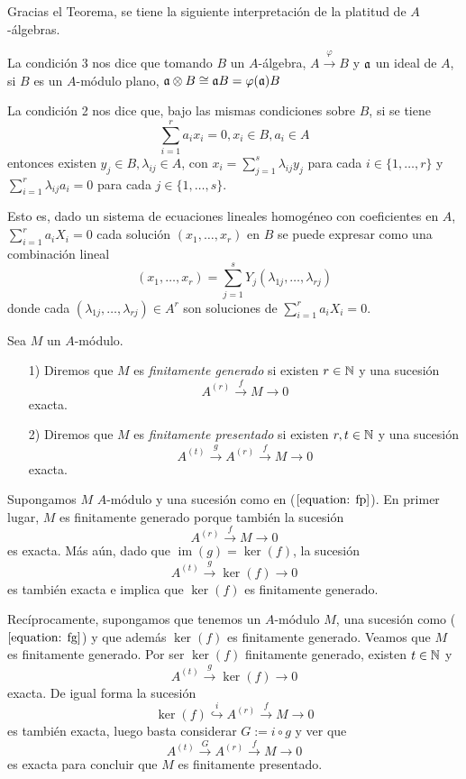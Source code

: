 \documentclass[../main.tex]{subfiles}
\begin{document}
\begin{remark} Gracias el Teorema, se tiene la siguiente interpretación de la platitud de $A$-álgebras.

	La condición 3 nos dice que tomando $B$ un $A$-álgebra, $A\overset{\varphi}{\rightarrow}B$ y $\mathfrak{a}$ un ideal de $A$, si $B$ es un $A$-módulo plano, $\mathfrak{a}\otimes B\cong \mathfrak{a} B=\varphi(\mathfrak{a})B$

	La condición 2 nos dice que, bajo las mismas condiciones sobre $B$, si se tiene $$\sum_{i=1}^r a_ix_i=0, x_i\in B, a_i\in A$$ entonces existen $y_j\in B, \lambda_{ij}\in A$, con $x_i=\sum_{j=1}^s\lambda_{ij}y_j$ para cada $i\in\{1,\dots,r\}$ y $\sum_{i=1}^r\lambda_{ij}a_i=0$ para cada $j\in\{1,\dots,s\}$.

	Esto es, dado un sistema de ecuaciones lineales homogéneo con coeficientes en $A$, $\sum_{i=1}^ra_iX_i=0$ cada solución  $(x_1,\dots,x_r)$ en $B$ se puede expresar como una combinación lineal$$(x_1,\dots,x_r)=\sum_{j=1}^sY_j(\lambda_{1j},\dots,\lambda_{rj})$$ donde cada $(\lambda_{1j},\dots,\lambda_{rj})\in A^r$ son soluciones de $\sum_{i=1}^ra_iX_i=0$.
\end{remark}
\begin{definition}
	Sea $M$ un $A$-módulo.
	\begin{itemize}
		\item[1)] Diremos que $M$ es \textit{finitamente generado} si existen $r\in\mathbb{N}$ y una sucesión
		\begin{equation}\label{equation: fg}
		A^{(r)}\overset{f}{\longrightarrow}M\longrightarrow 0
		\end{equation}
		exacta.
		\item[2)] Diremos que $M$ es \textit{finitamente presentado} si existen $r,t\in\mathbb{N}$ y una sucesión
		\begin{equation}\label{equation: fp}
		A^{(t)}\overset{g}{\longrightarrow}A^{(r)}\overset{f}{\longrightarrow}M\longrightarrow 0
		\end{equation}
		exacta.
	\end{itemize}
\end{definition}
\begin{remark}
	Supongamos $M$ $A$-módulo y una sucesión como en ($\ref{equation: fp}$). En primer lugar, $M$ es finitamente generado porque también la sucesión
	$$A^{(r)}\overset{f}{\longrightarrow}M\longrightarrow 0$$
	es exacta. Más aún, dado que $\operatorname{im}(g)=\ker(f)$, la sucesión
	$$A^{(t)}\overset{g}{\longrightarrow}\ker(f)\longrightarrow 0$$
	es también exacta e implica que $\ker(f)$ es finitamente generado.

	Recíprocamente, supongamos que tenemos un $A$-módulo $M$, una sucesión como ($\ref{equation: fg}$) y que además $\ker(f)$ es finitamente generado. Veamos que $M$ es finitamente generado.
	Por ser $\ker(f)$ finitamente generado, existen $t\in\mathbb{N}$ y $$A^{(t)}\overset{g}{\longrightarrow}\ker(f)\longrightarrow 0$$ exacta. De igual forma la sucesión
	$$\ker(f)\overset{i}{\hookrightarrow} A^{(r)}\overset{f}{\longrightarrow}M\longrightarrow 0$$ es también exacta, luego basta considerar $G:=i\circ g$ y ver que
	$$A^{(t)}\overset{G}{\longrightarrow}A^{(r)}\overset{f}{\longrightarrow}M\longrightarrow0$$
	es exacta para concluir que $M$ es finitamente presentado.
\end{remark}
\end{document}
